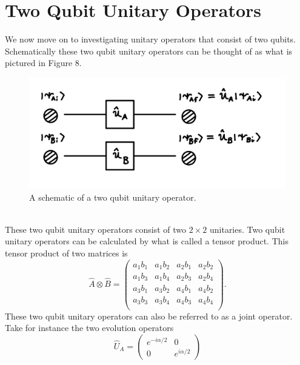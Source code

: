 \documentclass[twocolumn]{article}
\begin{document}
\section*{Two Qubit Unitary Operators}
We now move on to investigating unitary operators that consist of two qubits. Schematically these two qubit unitary operators can be thought of as what is pictured in Figure 8.
\begin{figure}[htpb]
\begin{center}
\includegraphics[width=0.90\linewidth]{Two-Qubit-Unitary-Schematic.jpg}
\caption{A schematic of a two qubit unitary operator.}
\end{center}
\end{figure}\\
These two qubit unitary operators consist of two $2\times2$ unitaries. Two qubit unitary operators can be calculated by what is called a tensor product. This tensor product of two matrices is
\begin{equation} \label{eq:26}
\hat{A}\otimes\hat{B}=
\left(\begin{array}{cccc}
a_1b_1 & a_1b_2 & a_2b_1 & a_2b_2 \\
a_1b_3 & a_1b_4 & a_2b_3 & a_2b_4 \\
a_3b_1 & a_3b_2 & a_4b_1 & a_4b_2 \\
a_3b_3 & a_3b_4 & a_4b_3 & a_4b_4 \\
\end{array}\right).
\end{equation}
These two qubit unitary operators can also be referred to as a joint operator. Take for instance the two evolution operators
\begin{equation} \label{eq:27}
\hat{U}_A=
\begin{pmatrix}
e^{-i\alpha/2} & 0 \\
0 & e^{i\alpha/2}
\end{pmatrix}
\end{equation}
\end{document}
